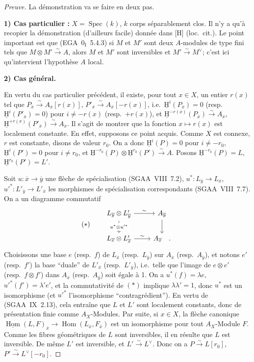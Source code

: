 \documentclass[11pt]{article}
\providecommand{\uH}{\underline{\mathrm H}}
\DeclareMathOperator{\Hom}{Hom}
\DeclareMathOperator{\Spec}{Spec}
\newcommand{\ol}[1]{\overline{#1}}
\providecommand{\Hom}{\operatorname{Hom}}
\providecommand{\Spec}{\operatorname{Spec}}
\providecommand{\Spec}{\operatorname{Spec}}
\providecommand{\Hom}{\operatorname{Hom}}
\providecommand{\Spec}{\operatorname{Spec}}
\providecommand{\Spec}{\operatorname{Spec}}
\begin{document}
\begin{proof}[Preuve]
La démonstration va se faire en deux pas.

\textbf{1) Cas particulier :} $X = \Spec(k)$, $k$ corps séparablement clos. Il n'y a qu'à recopier la démonstration (d'ailleurs facile) donnée dans [H] (loc.~cit.). Le point important est que (EGA~$0_{\mathrm{I}}$~5.4.3) si $M$ et $M'$ sont deux $A$-modules de type fini tels que $M \otimes M' \xrightarrow{\sim} A$, alors $M$ et $M'$ sont inversibles et $M' \xrightarrow{\sim} M^{\vee}$; c'est ici qu'intervient l'hypothèse $A$ local.

\textbf{2) Cas général.}

En vertu du cas particulier précédent, il existe, pour tout $x \in X$, un entier $r(x)$ tel que $P_{\ol{x}} \xrightarrow{\sim} A_{\ol{x}}[r(x)]$, $P'_{\ol{x}} \xrightarrow{\sim} A_{\ol{x}}[-r(x)]$, i.e.~$\uH^i(P_{\ol{x}}) = 0$ (resp.~$\uH^i(P'_{\ol{x}}) = 0$) pour $i \neq -r(x)$ (resp.~$+r(x)$), et $\uH^{-r(x)}(P_{\ol{x}}) \xrightarrow{\sim} A_{\ol{x}}$, $\uH^{+r(x)}(P'_{\ol{x}}) \xrightarrow{\sim} A_{\ol{x}}$. Il s'agit de montrer que la fonction $x \mapsto r(x)$ est localement constante. En effet, supposons ce point acquis. Comme $X$ est connexe, $r$ est constante, disons de valeur $r_0$. On a donc $\uH^i(P) = 0$ pour $i \neq -r_0$, $\uH^i(P') = 0$ pour $i \neq r_0$, et $\uH^{-r_0}(P) \otimes \uH^{r_0}(P') \xrightarrow{\sim} A$. Posons $\uH^{-r_0}(P) = L$, $\uH^{r_0}(P') = L'$.

Soit $u : \ol{x} \to \ol{y}$ une flèche de spécialisation (SGAA~VIII~7.2), $u^{*} : L_{\ol{y}} \to L_{\ol{x}}$, $u'^{*} : L'_{\ol{y}} \to L'_{\ol{x}}$ les morphismes de spécialisation correspondants (SGAA~VIII~7.7). On a un diagramme commutatif
\begin{equation*}
(*)\qquad
\begin{tikzcd}
L_{\ol{y}} \otimes L'_{\ol{y}} \arrow[r,"\sim"] \arrow[d,"u^{*} \otimes u'^{*}" description] & A_{\ol{y}} \arrow[d] \\
L_{\ol{x}} \otimes L'_{\ol{x}} \arrow[r,"\sim"] & A_{\ol{x}}\quad .
\end{tikzcd}
\end{equation*}
Choisissons une base $e$ (resp.~$f$) de $L_{\ol{x}}$ (resp.~$L_{\ol{y}}$) sur $A_{\ol{x}}$ (resp.~$A_{\ol{y}}$), et notons $e'$ (resp.~$f'$) la base ``duale'' de $L'_{\ol{x}}$ (resp.~$L'_{\ol{y}}$), i.e.~telle que l'image de $e \otimes e'$ (resp.~$f \otimes f'$) dans $A_{\ol{x}}$ (resp.~$A_{\ol{y}}$) soit égale à 1. On a $u^{*}(f) = \lambda e$, $u'^{*}(f') = \lambda' e'$, et la commutativité de $(*)$ implique $\lambda\lambda' = 1$, donc $u^{*}$ est un isomorphisme (et $u'^{*}$ l'isomorphisme ``contragrédient''). En vertu de (SGAA~IX~2.13), cela entraîne que $L$ et $L'$ sont localement constants, donc de présentation finie comme $A_X$-Modules. Par suite, si $x \in X$, la flèche canonique $\underline{\Hom}(L,F)_{\ol{x}} \to \Hom(L_{\ol{x}}, F_{\ol{x}})$ est un isomorphisme pour tout $A_X$-Module $F$. Comme les fibres géométriques de $L$ sont inversibles, il en résulte que $L$ est inversible. De même $L'$ est inversible, et $L' \xrightarrow{\sim} L^{\vee}$. Donc on a $P \xrightarrow{\sim} L[r_0]$, $P' \xrightarrow{\sim} L^{\vee}[-r_0]$.


\end{proof}
\end{document}
